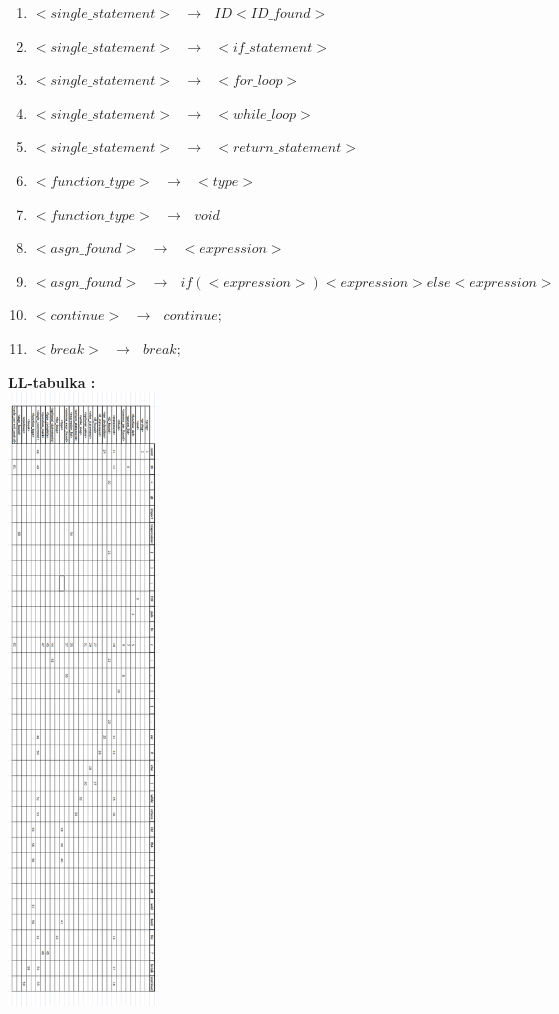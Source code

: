 \documentclass[12pt]{article}
\begin{document}
\begin{enumerate}
\item $ <single\_statement> \text{ }\to \text{ } ID <ID\_found>$
\item $ <single\_statement> \text{ }\to \text{ } <if\_statement>$
\item $ <single\_statement> \text{ }\to \text{ } <for\_loop>$
\item $<single\_statement> \text{ }\to \text{ } <while\_loop>$
\item $<single\_statement> \text{ }\to \text{ } <return\_statement>$
\item $<function\_type> \text{ }\to \text{ } <type>$
\item $<function\_type> \text{ }\to \text{ } void$
\item $<asgn\_found> \text{ }\to \text{ } <expression> $
\item $<asgn\_found> \text{ }\to \text{ } if (<expression>) <expression> else <expression>$
\item $<continue> \text{ }\to \text{ } continue ;$
\item $<break> \text{ }\to \text{ } break ;$

\end{enumerate}


 \Large \textbf{LL-tabulka :}
\newline \\

\includegraphics[width=0.3\textwidth,scale=0.3]{LLtabulka}
\end{document}
